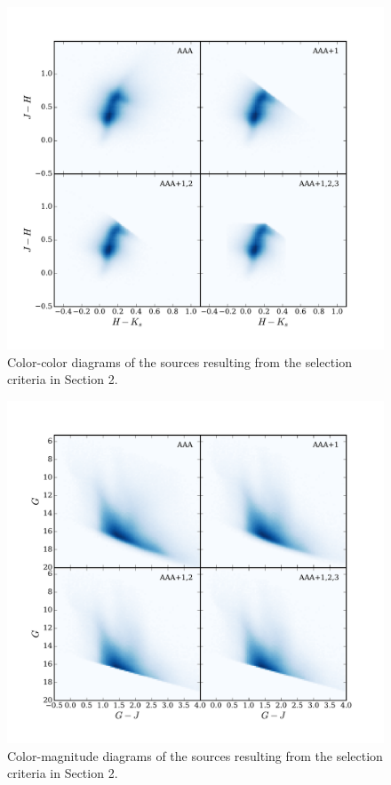 \documentclass[twocolumn]{aa}
\begin{document}
\begin{appendix}
\begin{figure}
\includegraphics[width = \hsize]{fig15.pdf}
\caption{Color-color diagrams of the sources resulting from the selection criteria in Section 2.}
\label{fig:app1}
\end{figure}
\begin{figure}
\includegraphics[width = \hsize]{fig16.pdf}
\caption{Color-magnitude diagrams of the sources resulting from the selection criteria in Section 2.}
\label{fig:app2}
\end{figure}


\end{appendix}
\end{document}
